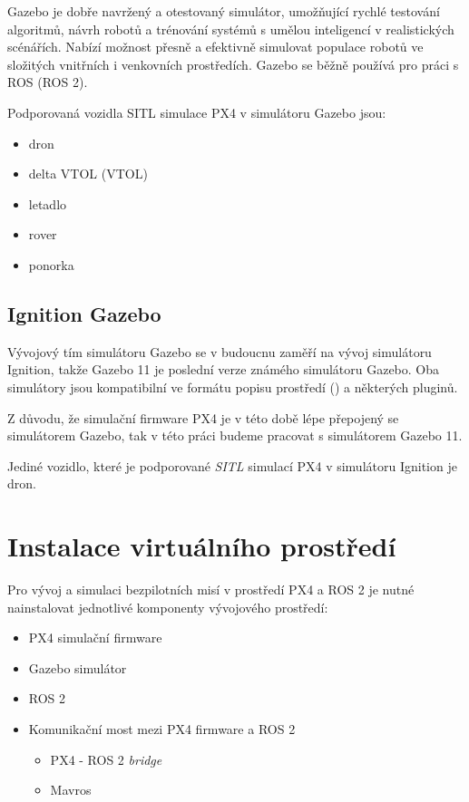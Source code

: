 Gazebo je dobře navržený a otestovaný simulátor, umožňující rychlé testování algoritmů, návrh robotů a trénování systémů s umělou inteligencí v realistických scénářích. Nabízí možnost přesně a efektivně simulovat populace robotů ve složitých vnitřních i venkovních prostředích. Gazebo se běžně používá pro práci s ROS (ROS 2). \cite{GAZ}

Podporovaná vozidla \acs{SITL} simulace PX4 v simulátoru Gazebo jsou:

\begin{itemize}
    \item dron
    \item delta \acs{VTOL} (\acl{VTOL})
    \item letadlo
    \item rover
    \item ponorka
\end{itemize}

\subsection{Ignition Gazebo}

Vývojový tím simulátoru Gazebo se v budoucnu zaměří na vývoj simulátoru Ignition, takže Gazebo 11 je poslední verze známého simulátoru Gazebo. Oba simulátory jsou kompatibilní ve formátu popisu prostředí () a některých pluginů. \cite{IGN}

Z důvodu, že simulační firmware PX4 je v této době lépe přepojený se simulátorem Gazebo, tak v této práci budeme pracovat s simulátorem Gazebo 11.

Jediné vozidlo, které je podporované \textit{\acl{SITL}} simulací PX4 v simulátoru Ignition je dron.

\section{Instalace virtuálního prostředí}

Pro vývoj a simulaci bezpilotních misí v prostředí PX4 a ROS 2 je nutné nainstalovat jednotlivé komponenty vývojového prostředí:

\begin{itemize}
    \item PX4 simulační firmware
    \item Gazebo simulátor
    \item ROS 2 
    \item Komunikační most mezi PX4 firmware a ROS 2
    \begin{itemize}
        \item PX4 - ROS 2 \textit{bridge}
        \item Mavros\\
    \end{itemize}
\end{itemize}

